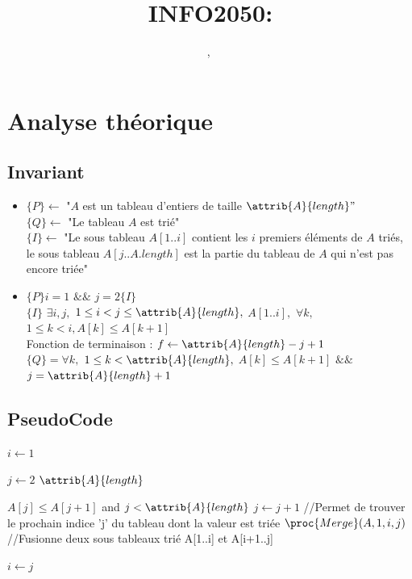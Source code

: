 \documentclass[a4paper, 11pt, oneside]{article}
\title{INFO2050: \intitule}
\author{\PrenomUN~\textsc{\NomUN}, \PrenomDEUX~\textsc{\NomDEUX}}
\date{}
\begin{document}
\maketitle
\newpage


	\section{Analyse théorique}
	\subsection{Invariant}
	\begin{itemize}[label=$\square$]

\item

	\noindent $\{P\} \gets$ "$A$ est un tableau d'entiers de taille $\attrib{A}{length}"$\\
	  $\{Q\} \gets$ "Le tableau $A$ est trié"\\ 
	$\{I\} \gets$ "Le sous tableau 
$A[1..i]$ contient les $i$ premiers éléments de $A$ triés, le sous tableau \indent \indent $A[j..A.length]$ est la partie du tableau de $A$ qui n'est pas encore triée"

\item $\{P\} i = 1$ $\&\&$ $j = 2 \{I\}$
\\ $\{I\}$  $\exists i,j,$ $1 \leq i < j \leq \attrib{A}{length},$  $A[1..i],$ $\forall k,$ $1 \leq k < i, A[k] \leq A[k+1]$ \\
\indent Fonction de terminaison : $f \gets \attrib{A}{length}-j +1$
\\ $\{Q\} = \forall k,$ $1 \leq k < \attrib{A}{length},$ $A[k] \leq A[k+1]$ $\&\&$ $j=\attrib{A}{length}+1$

\end{itemize}

	\subsection{PseudoCode}
	\label{PseudoCode}
	
	\begin{codebox}
\li $i \gets 1$

\li \For $j \gets 2$ \To $\attrib{A}{length}$
\Do

\li \While $A[j] \leq A[j+1]$ and $j < \attrib{A}{length}$
\li \Do
$j \gets j + 1$  \color{Gray} //Permet de trouver le prochain indice 'j' du tableau dont la valeur est triée
\End
\li $\proc{Merge}(A, 1, i, j)$  \color{Gray} //Fusionne deux sous tableaux trié A[1..i] et A[i+1..j]

\li $i \gets j$
\End
\end{codebox}
\end{document}
